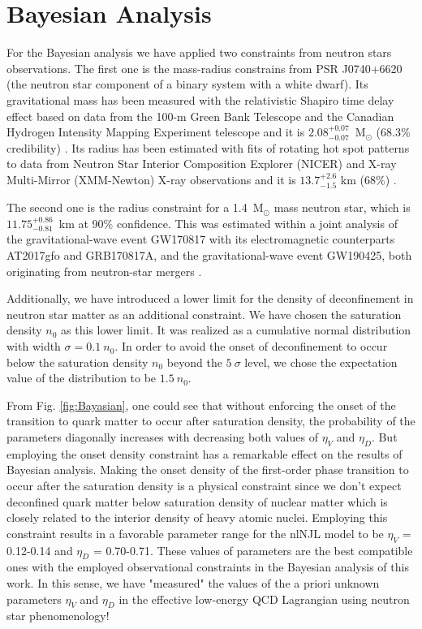 \documentclass[%
 reprint,
superscriptaddress,
nofootinbib,
 amsmath,amssymb,
 aps,
]{revtex4-1}
\begin{document}
\section{Bayesian Analysis}\label{sec:Bayasian}

For the Bayesian analysis we have applied two constraints from neutron stars observations. The first one is the mass-radius constrains from PSR J0740+6620 (the neutron star component of a binary system with a white dwarf). 
Its gravitational mass has been measured with the relativistic Shapiro time delay effect based on data from the 100-m Green Bank Telescope and the Canadian Hydrogen Intensity Mapping Experiment telescope and it is ${2.08}_{-0.07}^{+0.07}$~M$_{\odot}$ (68.3\% credibility) \cite{Cromartie:2019kug, fonseca2021refined}. 
Its radius has been estimated with fits of rotating hot spot patterns to data from Neutron Star Interior Composition Explorer (NICER) and X-ray Multi-Mirror (XMM-Newton) X-ray observations and it is ${13.7}_{-1.5}^{+2.6}$ km (68\%) \cite{miller2021radius}.

The second one is the radius constraint for a 1.4~M$_{\odot}$ mass neutron star, which is ${11.75}^{+0.86}_{-0.81}$~km at 90\% confidence. This was estimated within a joint analysis of the gravitational-wave event GW170817 with its electromagnetic counterparts AT2017gfo and GRB170817A, and the gravitational-wave event GW190425, both originating from neutron-star mergers \cite{dietrich2020multimessenger}.

Additionally, we have introduced a lower limit for the density of deconfinement in neutron star matter as an additional constraint. We have chosen the saturation density $n_0$ as this lower limit. 
It was realized as a cumulative normal distribution with width $\sigma = 0.1~n_0$. 
In order to avoid the onset of deconfinement to occur below the saturation density $n_0$ beyond the $5~\sigma$ level, we chose the expectation value of the distribution to be $1.5~n_0$.

{From Fig. \ref{fig:Bayasian}, one could see that without enforcing the onset of the  transition  to quark matter to occur after saturation density, the probability of the parameters diagonally increases with decreasing both values of $\eta_V$ and $\eta_D$. But employing the onset density constraint has a remarkable effect on the results of Bayesian analysis.
Making the onset density of the first-order phase transition to occur after the saturation density is a physical constraint since we don't expect deconfined quark matter below saturation density of nuclear matter which is closely related to the interior density of heavy atomic nuclei.
Employing this constraint results in a favorable parameter range for the nlNJL model to be $\eta_V$ = 0.12-0.14 and $\eta_D$ = 0.70-0.71. These values of parameters are the best compatible ones with the employed observational constraints in the Bayesian analysis of this work.
In this sense, we have "measured" the values of the a priori unknown parameters $\eta_V$ and $\eta_D$ in the effective low-energy QCD Lagrangian using neutron star phenomenology!
}
\end{document}
